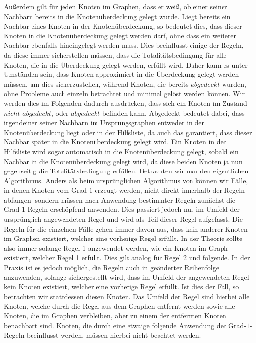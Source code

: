 \documentclass[12pt,onecolumn, notitlepage]{scrartcl}
\begin{document}
Außerdem gilt für jeden Knoten im Graphen, dass er weiß, ob einer seiner Nachbarn bereits in die Knotenüberdeckung gelegt wurde. Liegt bereits ein Nachbar eines Knoten in der Knotenüberdeckung, so bedeutet dies, dass dieser Knoten in die Knotenüberdeckung gelegt werden darf, ohne dass ein weiterer Nachbar ebenfalls hineingelegt werden muss.\newline 
Dies beeinflusst einige der Regeln, da diese immer sicherstellen müssen, dass die Totalitätsbedingung für alle Knoten, die in die Überdeckung gelegt werden, erfüllt wird. Daher kann es unter Umständen sein, dass Knoten approximiert in die Überdeckung gelegt werden müssen, um dies sicherzustellen, während Knoten, die bereits $abgedeckt$ wurden, ohne Probleme auch einzeln betrachtet und minimal gelöst werden können. Wir werden dies im Folgenden dadurch ausdrücken, dass sich ein Knoten im Zustand $nicht$ $abgedeckt$, oder $abgedeckt$ befinden kann. Abgedeckt bedeutet dabei, dass irgendeiner seiner Nachbarn im Ursprungsgraphen entweder in der Knotenüberdeckung liegt oder in der Hilfsliste, da auch das garantiert, dass dieser Nachbar später in die Knotenüberdeckung gelegt wird. Ein Knoten in der Hilfsliste wird sogar automatisch in die Knotenüberdeckung gelegt, sobald ein Nachbar in die Knotenüberdeckung gelegt wird, da diese beiden Knoten ja nun gegenseitig die Totalitätsbedingung erfüllen. \newline \newline
Betrachten wir nun den eigentlichen Algorithmus. Anders als beim ursprünglichen Algorithmus von\cite{BraFer} können wir Fälle, in denen Knoten vom Grad $1$ erzeugt werden, nicht direkt innerhalb der Regeln abfangen, sondern müssen nach Anwendung bestimmter Regeln zunächst die Grad-$1$-Regeln erschöpfend anwenden. Dies passiert jedoch nur im Umfeld der ursprünglich angewendeten Regel und wird als Teil dieser Regel aufgefasst. Die Regeln für die einzelnen Fälle gehen immer davon aus, dass kein anderer Knoten im Graphen existiert, welcher eine vorherige Regel erfüllt. In der Theorie sollte also immer solange Regel 1 angewendet werden, wie ein Knoten im Graph existiert, welcher Regel 1 erfüllt. Dies gilt analog für Regel 2 und folgende. \newline 
In der Praxis ist es jedoch möglich, die Regeln auch in geänderter Reihenfolge anzuwenden, solange sichergestellt wird, dass im Umfeld der angewendeten Regel kein Knoten existiert, welcher eine vorherige Regel erfüllt. Ist dies der Fall, so betrachten wir stattdessen diesen Knoten. Das Umfeld der Regel sind hierbei alle Knoten, welche durch die Regel aus dem Graphen entfernt werden sowie alle Knoten, die im Graphen verbleiben, aber zu einem der entfernten Knoten benachbart sind. Knoten, die durch eine etwaige folgende Anwendung der Grad-$1$-Regeln beeinflusst werden, müssen hierbei nicht beachtet werden. \newline
\end{document}
